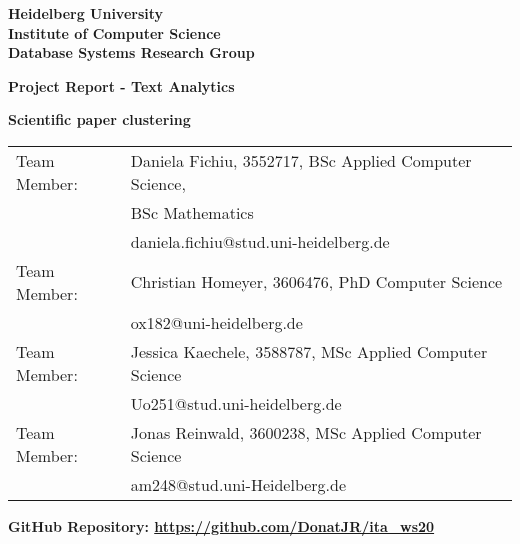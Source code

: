 \documentclass[
     12pt,         %
     a4paper,      %
     BCOR10mm,     %
     DIV14,        %
     ]{article}
\begin{document}
\begin{titlepage}


\vspace*{1cm}
\begin{center}
\vspace*{3cm}
\textbf{ 
\Large Heidelberg University\\
\smallskip
\Large Institute of Computer Science\\
\smallskip
\Large Database Systems Research Group\\
\smallskip
}

\vspace{3cm}

\textbf{\large Project Report - Text Analytics}

\vspace{0.5\baselineskip}
{\huge
\textbf{Scientific paper clustering}
}
\end{center}

\vfill 

{\large
\begin{tabular}[l]{ll}
Team Member: & Daniela Fichiu, 3552717, BSc Applied Computer Science,\\
  & BSc Mathematics\\
  & daniela.fichiu@stud.uni-heidelberg.de\\
Team Member: & Christian Homeyer, 3606476, PhD Computer Science \\
  & ox182@uni-heidelberg.de\\
Team Member: & Jessica Kaechele, 3588787, MSc Applied Computer Science\\
  & Uo251@stud.uni-heidelberg.de\\
Team Member: & Jonas Reinwald, 3600238, MSc Applied Computer Science\\
  & am248@stud.uni-Heidelberg.de\\
  
\end{tabular}
}

{
  \textbf{GitHub Repository: \url{https://github.com/DonatJR/ita_ws20}}
}

\end{titlepage}


% 





\end{document}

